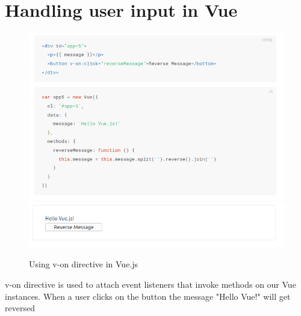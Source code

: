 \documentclass[12pt,a4paper,oneside]{report}
\begin{document}
\section{Handling user input in Vue}  
\begin{figure}[H]
    \begin{center}
        \label{abc}
            \includegraphics[scale=.6]{v-on.png}
            \includegraphics[scale=.6]{v-onOutput.png}
            \caption{Using v-on directive  in Vue.js \cite{vue-code} }
    \end{center}
\end{figure}
\begin{center}
    
\end{center}
v-on directive is used  to attach event listeners that invoke methods on our Vue instances. When a user clicks on the button the message "Hello Vue!" will get reversed
\newpage 
\end{document}
